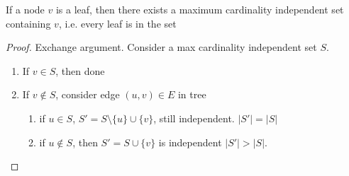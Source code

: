 \documentclass[11pt]{article}
\begin{document}
\begin{lemma*}
    If a node $v$ is a leaf, then there exists a maximum cardinality independent set containing $v$, i.e. every leaf is in the set 
    \begin{proof}
        Exchange argument. Consider a max cardinality independent set $S$. 
        \begin{enumerate}
            \item If $v\in S$, then done 
            \item If $v\not\in S$, consider edge $(u,v)\in E$ in tree
            \begin{enumerate}
                \item if $u\in S$, $S'  = S\setminus \{ u\} \cup \{ v\}$, still independent. $|S'| = |S|$
                \item if $u\not\in S$, then $S' = S \cup \{ v \}$ is independent  $|S'| > |S|$.
            \end{enumerate} 
        \end{enumerate}
        
    \end{proof}
\end{lemma*}

\begin{algorithm}[H]

    
\end{algorithm}
\end{document}
